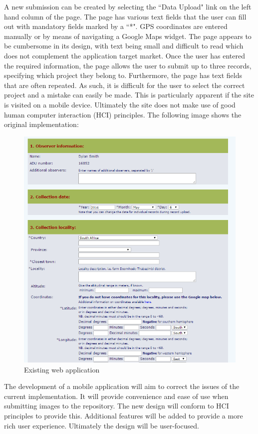 \documentclass[12pt,a4paper,oneside]{report}
\begin{document}
\begin{spacing}{1.4}
    A new submission can be created by selecting the ``Data Upload" link on the left hand column of the page. The page has various text fields that the user can fill out with mandatory fields marked by a ``*".  GPS coordinates are entered manually or by means of navigating a Google Maps widget.  The page appears to be cumbersome in its design, with text being small and difficult to read which does not complement the application target market. Once the user has entered the required information, the page allows the user to submit up to three records, specifying which project they belong to.  Furthermore, the page has text fields that are often repeated.  As such, it is difficult for the user to select the correct project and a mistake can easily be made.  This is particularly apparent if the site is visited on a mobile device.  Ultimately the site does not make use of good human computer interaction (HCI) principles. The following image shows the original implementation:
    \begin{figure}[H]
			\centering
      \includegraphics[width=12cm]{existing}
      \caption{Existing web application}
    \end{figure}
  \end{spacing}

  The development of a mobile application will aim to correct the issues of the current implementation.  It will provide
  convenience and ease of use when submitting images to the repository.  The new design will conform to HCI principles to provide this.  Additional features will be added to provide a more rich user experience. Ultimately the design will be user-focused.
\end{document}
